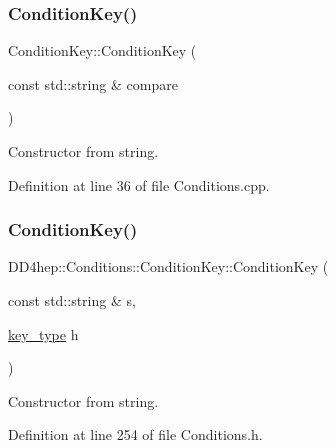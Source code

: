 \subsubsection{\texorpdfstring{Condition\+Key()}{ConditionKey()}\hspace{0.1cm}{\footnotesize\ttfamily [2/4]}}
{\footnotesize\ttfamily Condition\+Key\+::\+Condition\+Key (\begin{DoxyParamCaption}\item[{const std\+::string \&}]{compare }\end{DoxyParamCaption})}



Constructor from string. 



Definition at line 36 of file Conditions.\+cpp.

\hypertarget{class_d_d4hep_1_1_conditions_1_1_condition_key_a18c78ead871dbf313c582dad6e2ae336}{}\label{class_d_d4hep_1_1_conditions_1_1_condition_key_a18c78ead871dbf313c582dad6e2ae336} 
\subsubsection{\texorpdfstring{Condition\+Key()}{ConditionKey()}\hspace{0.1cm}{\footnotesize\ttfamily [3/4]}}
{\footnotesize\ttfamily D\+D4hep\+::\+Conditions\+::\+Condition\+Key\+::\+Condition\+Key (\begin{DoxyParamCaption}\item[{const std\+::string \&}]{s,  }\item[{\hyperlink{class_d_d4hep_1_1_conditions_1_1_condition_key_a08bfc8ccb807bdd5e4d9f3b065d1c8f5}{key\+\_\+type}}]{h }\end{DoxyParamCaption})\hspace{0.3cm}{\ttfamily [inline]}}



Constructor from string. 



Definition at line 254 of file Conditions.\+h.

\hypertarget{class_d_d4hep_1_1_conditions_1_1_condition_key_a66405dd06d894a5f871f8ad8640f1db5}{}\label{class_d_d4hep_1_1_conditions_1_1_condition_key_a66405dd06d894a5f871f8ad8640f1db5} 
